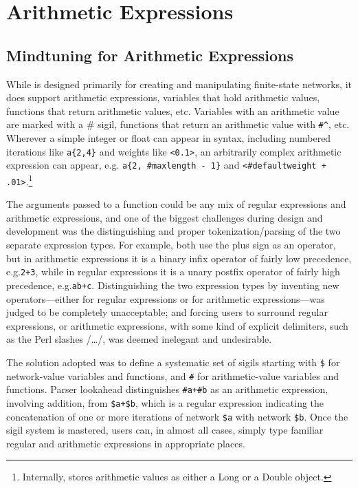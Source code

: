 \chapter{Arithmetic Expressions}

\label{chapt:arithmeticexpressions}

\section{Mindtuning for Arithmetic Expressions}

While \Kleene{} is designed primarily for creating and manipulating
finite-state networks, it does support arithmetic expressions, variables
that hold arithmetic values, functions that return arithmetic values,
etc.  Variables with an arithmetic value are marked with a \# sigil,
functions that return an arithmetic value with \verb!#^!, etc.  Wherever a
simple integer or float can appear in \Kleene{} syntax, including
numbered iterations like \verb!a{2,4}! and weights like \verb!<0.1>!, an
arbitrarily complex arithmetic expression can appear, e.g.\@ 
\verb!a{2, #maxlength - 1}! and \verb!<#defaultweight + .01>!.\footnote{Internally,
\Kleene{} stores arithmetic values as either a Long or a Double object.}

The arguments passed to a function could be any mix of regular
expressions and arithmetic expressions, and one of the biggest challenges
during \Kleene{} design and development was the distinguishing and proper
tokenization/parsing of the two separate expression types.  For example,
both use the plus sign as an operator, but in arithmetic expressions it
is a binary infix operator of fairly low precedence, e.g.\@  \verb!2+3!,
while in regular expressions it is a unary postfix operator of fairly
high precedence, e.g.\@ \verb!ab+c!.  Distinguishing the two
expression types by inventing new operators---either for regular
expressions or for arithmetic expressions---was judged to be
completely unacceptable; and forcing users to surround regular
expressions, or arithmetic expressions, with some kind of explicit
delimiters, such as the Perl slashes /\ldots/, was deemed inelegant
and undesirable.

The solution adopted was to define a systematic set of sigils starting
with \verb!$! for network-value variables and functions, and \verb!#! for
arithmetic-value variables and functions.  Parser lookahead distinguishes
\verb!#a+#b! as an arithmetic expression, involving addition, from
\verb!$a+$b!, which is a regular expression indicating the concatenation
of one or more iterations of network \verb!$a! with network \verb!$b!.
Once the sigil system is mastered, users can, in almost all cases, simply
type familiar regular and arithmetic expressions in appropriate places. 


